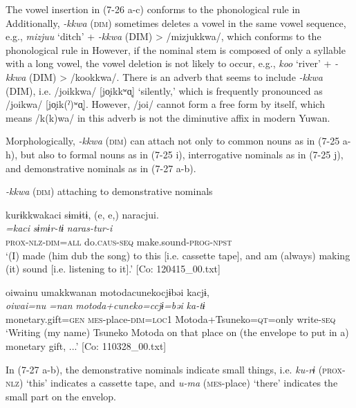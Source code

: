 The vowel insertion in (7-26 a-c) conforms to the phonological rule in  Additionally, \textit{{}-kkwa} (\textsc{dim}) sometimes deletes a vowel in the same vowel sequence, e.g., \textit{mizjuu} ‘ditch’ + \textit{{}-kkwa} (DIM) > /mizjukkwa/, which conforms to the phonological rule in  However, if the nominal stem is composed of only a syllable with a long vowel, the vowel deletion is not likely to occur, e.g., \textit{koo} ‘river’ + \textit{{}-kkwa} (DIM) > /kookkwa/. There is an adverb that seems to include \textit{{}-kkwa} (DIM), i.e. /joikkwa/ [jo̞ikkʷɑ̞] ‘silently,’ which is frequently pronounced as /joikwa/ [jo̞ik(ˀ)ʷɑ̞]. However, /joi/ cannot form a free form by itself, which means /k(k)wa/ in this adverb is not the diminutive affix in modern Yuwan.

  Morphologically, \textit{{}-kkwa} (\textsc{dim}) can attach not only to common nouns as in (7-25 a-h), but also to formal nouns as in (7-25 i), interrogative nominals as in (7-25 j), and demonstrative nominals as in (7-27 a-b).

\ea \label{ex:7:27}  \textit{{}-kkwa} (\textsc{dim}) attaching to demonstrative nominals

\ea \label{ex:7:a}%
\glll  kurɨkkwakaci  sɨmɨtɨ,  (e, e,)  naracjui.\\
\textit{=kaci}  \textit{sɨmɨr-tɨ}    \textit{naras-tur-i}\\
\textsc{prox}-\textsc{nlz}-\textsc{dim}=\textsc{all}  do.\textsc{caus}-\textsc{seq}    make.sound-\textsc{prog}-\textsc{npst}\\
\glt ‘(I) made (him dub the song) to this [i.e. cassette tape], and am (always) making (it) sound [i.e. listening to it].’ [Co: 120415\_00.txt]

\ex \label{ex:7:b}%
\glll  {\textbar}oiwai{\textbar}nu  umakkwanan  motodacunekocjɨbəi kacjɨ,    \\
\textit{oiwai=nu}  \textit{=nan}  \textit{motoda+cuneko=ccjɨ=bəi}  \textit{ka-tɨ}\\
monetary.gift=\textsc{gen}  \textsc{mes}-place-\textsc{dim}=\textsc{loc}1  Motoda+Tsuneko=\textsc{qt}=only       write-\textsc{seq}    \\
\glt ‘Writing (my name) Tsuneko Motoda on that place on (the envelope to put in a) monetary gift, ...’ [Co: 110328\_00.txt]
\z
\z

In (7-27 a-b), the demonstrative nominals indicate small things, i.e. \textit{ku-rɨ} (\textsc{prox}-\textsc{nlz}) ‘this’ indicates a cassette tape, and \textit{u-ma} (\textsc{mes}-place) ‘there’ indicates the small part on the envelop.

